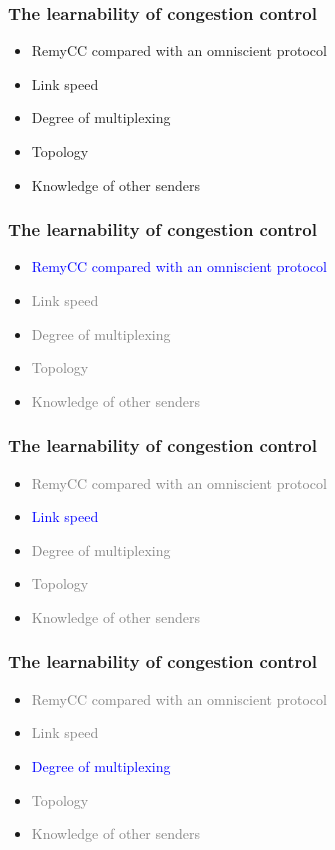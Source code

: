 \documentclass[svgnames]{beamer}
\begin{document}
\begin{Large}
\begin{frame}
\frametitle{The learnability of congestion control}
\begin{itemize}
\item RemyCC compared with an omniscient protocol
\item Link speed
\item Degree of multiplexing
\item Topology
\item Knowledge of other senders
\end{itemize}
\end{frame}

\begin{frame}
\frametitle{The learnability of congestion control}
\begin{itemize}
\item \textcolor{blue}{RemyCC compared with an omniscient protocol}
\item \textcolor{gray}{Link speed}
\item \textcolor{gray}{Degree of multiplexing}
\item \textcolor{gray}{Topology}
\item \textcolor{gray}{Knowledge of other senders}
\end{itemize}
\end{frame}



\begin{frame}
\frametitle{The learnability of congestion control}
\begin{itemize}
\item \textcolor{gray}{RemyCC compared with an omniscient protocol}
\item \textcolor{blue}{Link speed}
\item \textcolor{gray}{Degree of multiplexing}
\item \textcolor{gray}{Topology}
\item \textcolor{gray}{Knowledge of other senders}
\end{itemize}
\end{frame}



\begin{frame}
\frametitle{The learnability of congestion control}
\begin{itemize}
\item \textcolor{gray}{RemyCC compared with an omniscient protocol}
\item \textcolor{gray}{Link speed}
\item \textcolor{blue}{Degree of multiplexing}
\item \textcolor{gray}{Topology}
\item \textcolor{gray}{Knowledge of other senders}
\end{itemize}
\end{frame}


\end{Large}
\end{document}
